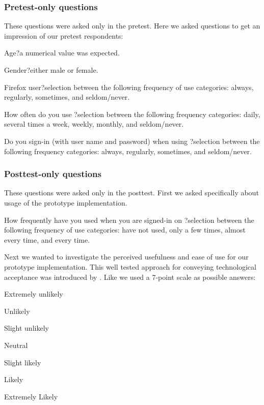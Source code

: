\subsubsection{Pretest-only questions}

These questions were asked only in the pretest. Here we asked questions to
get an impression of our pretest respondents:

\begin{items}
  \item Age{}?\dash{}a numerical value was expected.
  \item Gender{}?\dash{}either male or female.
  \item Firefox user{}?\dash{}selection between the following frequency of use
    categories: always, regularly, sometimes, and seldom/never.
  \item How often do you use \urort{}?\dash{}selection between the following
    frequency categories: daily, several times a week, weekly, monthly,
    and seldom/never.
  \item Do you sign-in (with user name and password) when using
    \urort{}?\dash{}selection between the following frequency
    categories: always, regularly, sometimes, and seldom/never.
\end{items}

\subsubsection{Posttest-only questions}

These questions were asked only in the posttest. First we asked specifically
about usage of the prototype implementation.

\begin{items}
  \item How frequently have you used \latest{} when you are
    signed-in on \urort{}?\dash{}selection between the following
    frequency of use categories: have not used, only a few times, almost
    every time, and every time.
\end{items}

Next we wanted to investigate the perceived usefulness and ease of use for
our prototype implementation. This well tested approach for conveying
technological acceptance was introduced by \citet{davis89}.
Like \citet[]{davis89} we used a 7-point scale as possible answers:

\begin{items}
  \item Extremely unlikely
  \item Unlikely
  \item Slight unlikely
  \item Neutral
  \item Slight likely
  \item Likely
  \item Extremely Likely
\end{items}

